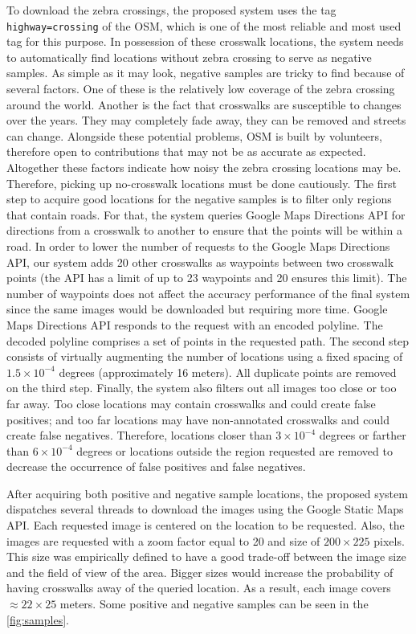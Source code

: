 \documentclass[journal]{IEEEtran}
\newcommand{\GoogleStaticMapsAPI}{Google Static Maps API\xspace}
\newcommand{\GoogleDirectionsAPI}{Google Maps Directions API\xspace}
\begin{document}
To download the zebra crossings, the proposed system uses the tag \texttt{highway=crossing} of the OSM, which is one of the most reliable and most used tag for this purpose. In possession of these crosswalk locations, the system needs to automatically find locations without zebra crossing to serve as negative samples. As simple as it may look, negative samples are tricky to find because of several factors. One of these is the relatively low coverage of the zebra crossing around the world. Another is the fact that crosswalks are susceptible to changes over the years. They may completely fade away, they can be removed and streets can change. Alongside these potential problems, OSM is built by volunteers, therefore open to contributions that may not be as accurate as expected. Altogether these factors indicate how noisy the zebra crossing locations may be. Therefore, picking up no-crosswalk locations must be done cautiously. The first step to acquire good locations for the negative samples is to filter only regions that contain roads. For that, the system queries \GoogleDirectionsAPI for directions from a crosswalk to another to ensure that the points will be within a road. In order to lower the number of requests to the \GoogleDirectionsAPI, our system adds 20 other crosswalks as waypoints between two crosswalk points (the API has a limit of up to 23 waypoints and 20 ensures this limit). The number of waypoints does not affect the accuracy performance of the final system since the same images would be downloaded but requiring more time. \GoogleDirectionsAPI responds to the request with an encoded polyline. The decoded polyline comprises a set of points in the requested path. The second step consists of virtually augmenting the number of locations using a fixed spacing of $1.5 \times 10^{-4}$ degrees (approximately 16 meters). All duplicate points are removed on the third step. Finally, the system also filters out all images too close or too far away. Too close locations may contain crosswalks and could create false positives; and too far locations may have non-annotated crosswalks and could create false negatives. Therefore, locations closer than $3 \times 10^{-4}$ degrees or farther than $6 \times 10^{-4}$ degrees or locations outside the region requested are removed to decrease the occurrence of false positives and false negatives.

After acquiring both positive and negative sample locations, the proposed system dispatches several threads to download the images using the \GoogleStaticMapsAPI. Each requested image is centered on the location to be requested. Also, the images are requested with a zoom factor equal to 20 and size of $200\times225$ pixels. This size was empirically defined to have a good trade-off between the image size and the field of view of the area. Bigger sizes would increase the probability of having crosswalks away of the queried location. As a result, each image covers $\approx 22 \times 25$ meters. Some positive and negative samples can be seen in the \autoref{fig:samples}.
\end{document}
